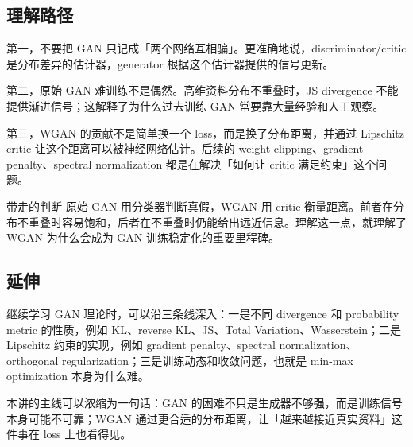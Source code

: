 \documentclass[a4paper]{article}
\begin{document}
\subsection{理解路径}

第一，不要把 GAN 只记成「两个网络互相骗」。更准确地说，discriminator/critic 是分布差异的估计器，generator 根据这个估计器提供的信号更新。

第二，原始 GAN 难训练不是偶然。高维资料分布不重叠时，JS divergence 不能提供渐进信号；这解释了为什么过去训练 GAN 常要靠大量经验和人工观察。

第三，WGAN 的贡献不是简单换一个 loss，而是换了分布距离，并通过 Lipschitz critic 让这个距离可以被神经网络估计。后续的 weight clipping、gradient penalty、spectral normalization 都是在解决「如何让 critic 满足约束」这个问题。

\begin{importantbox}{带走的判断}
    原始 GAN 用分类器判断真假，WGAN 用 critic 衡量距离。前者在分布不重叠时容易饱和，后者在不重叠时仍能给出远近信息。理解这一点，就理解了 WGAN 为什么会成为 GAN 训练稳定化的重要里程碑。
\end{importantbox}

\subsection{延伸}

继续学习 GAN 理论时，可以沿三条线深入：一是不同 divergence 和 probability metric 的性质，例如 KL、reverse KL、JS、Total Variation、Wasserstein；二是 Lipschitz 约束的实现，例如 gradient penalty、spectral normalization、orthogonal regularization；三是训练动态和收敛问题，也就是 min-max optimization 本身为什么难。

本讲的主线可以浓缩为一句话：GAN 的困难不只是生成器不够强，而是训练信号本身可能不可靠；WGAN 通过更合适的分布距离，让「越来越接近真实资料」这件事在 loss 上也看得见。
\end{document}
